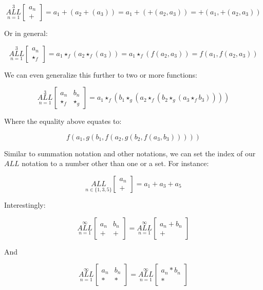 \documentclass{article}
\begin{document}
$$\underset{n=1}{\overset{3}{ALL}} \begin{bmatrix}
a_n \\
+
\end{bmatrix} = a_1+(a_2+(a_3)) = a_1+(+(a_2,a_3))=+(a_1,+(a_2,a_3))$$

Or in general:

$$\underset{n=1}{\overset{3}{ALL}} \begin{bmatrix}
a_n \\
\star_f
\end{bmatrix} = a_1\star_f(a_2\star_f(a_3)) = a_1\star_f(f(a_2,a_3))=f(a_1,f(a_2,a_3))$$

We can even generalize this further to two or more functions:

$$\underset{n=1}{\overset{3}{ALL}} \begin{bmatrix}
a_n & b_n\\
\star_f & \star_g
\end{bmatrix} = a_1 \star_f (b_1 \star_g (a_2  \star_f (b_2 \star_g (a_3 \star_f b_3))))$$

Where the equality above equates to:

$$f(a_1,g(b_1,f(a_2,g(b_2,f(a_3,b_3)))))$$

Similar to summation notation and other notations, we can set the index of our $ALL$ notation to a number other than one or a set. For instance:

$$\underset{n\in \{ 1, 3, 5 \}}{ALL} \begin{bmatrix}
a_n \\
+
\end{bmatrix} = a_1+a_3+a_5$$

Interestingly:

$$\underset{n=1}{\overset{\infty}{ALL}} \begin{bmatrix}
a_n & b_n \\
+& +
\end{bmatrix} = \underset{n=1}{\overset{\infty}{ALL}} \begin{bmatrix}
a_n + b_n \\
 +
\end{bmatrix}$$

And

$$\underset{n=1}{\overset{\infty}{ALL}} \begin{bmatrix}
a_n & b_n \\
*& *
\end{bmatrix} = \underset{n=1}{\overset{\infty}{ALL}} \begin{bmatrix}
a_n * b_n \\
 *
\end{bmatrix}$$
\end{document}
